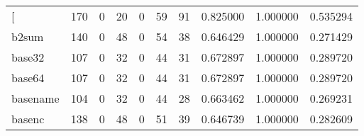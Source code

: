 \begin{longtable}{lrrrrrrrrr}
\bottomrule
\endlastfoot
{[}         &                                                170 &                                                  0 &                                                 20 &                                                  0 &                                                 59 &                                                 91 &                                           0.825000 &                               1.000000 &                             0.535294 \\
b2sum     &                                                140 &                                                  0 &                                                 48 &                                                  0 &                                                 54 &                                                 38 &                                           0.646429 &                               1.000000 &                             0.271429 \\
base32    &                                                107 &                                                  0 &                                                 32 &                                                  0 &                                                 44 &                                                 31 &                                           0.672897 &                               1.000000 &                             0.289720 \\
base64    &                                                107 &                                                  0 &                                                 32 &                                                  0 &                                                 44 &                                                 31 &                                           0.672897 &                               1.000000 &                             0.289720 \\
basename  &                                                104 &                                                  0 &                                                 32 &                                                  0 &                                                 44 &                                                 28 &                                           0.663462 &                               1.000000 &                             0.269231 \\
basenc    &                                                138 &                                                  0 &                                                 48 &                                                  0 &                                                 51 &                                                 39 &                                           0.646739 &                               1.000000 &                             0.282609 \\

\end{longtable}

